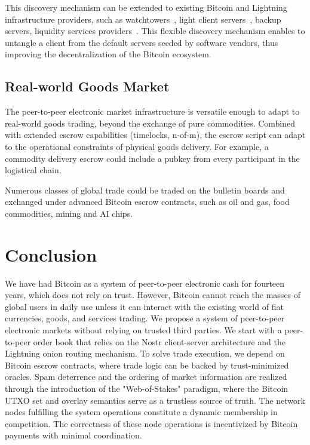 \documentclass[pdflatex,sn-mathphys]{sn-jnl}%
\theoremstyle{thmstyleone}%
\theoremstyle{thmstyletwo}%
\theoremstyle{thmstylethree}%
\begin{document}
This discovery mechanism can be extended to existing Bitcoin and Lightning infrastructure providers, such as watchtowers~\cite{Watchtower2016Dryja}, light client servers~\cite{Lightweight2013Hearn}, backup servers, liquidity services providers~\cite{LSP2019Sheinfeld}. This flexible discovery mechanism enables to untangle a client from the default servers seeded by software vendors, thus improving the decentralization of the Bitcoin ecosystem.

\subsection{Real-world Goods Market}

The peer-to-peer electronic market infrastructure is versatile enough to adapt to real-world goods trading, beyond the exchange of pure commodities. Combined with extended escrow capabilities (timelocks, n-of-m), the escrow script can adapt to the operational constraints of physical goods delivery. For example, a commodity delivery escrow could include a pubkey from every participant in the logistical chain.

Numerous classes of global trade could be traded on the bulletin boards and exchanged under advanced Bitcoin escrow contracts, such as oil and gas, food commodities, mining and AI chips.

\section{Conclusion}

We have had Bitcoin as a system of peer-to-peer electronic cash for fourteen years, which does not rely on trust. However, Bitcoin cannot reach the masses of global users in daily use unless it can interact with the existing world of fiat currencies, goods, and services trading. We propose a system of peer-to-peer electronic markets without relying on trusted third parties. We start with a peer-to-peer order book that relies on the Nostr client-server architecture and the Lightning onion routing mechanism. To solve trade execution, we depend on Bitcoin escrow contracts, where trade logic can be backed by trust-minimized oracles. Spam deterrence and the ordering of market information are realized through the introduction of the "Web-of-Stakes" paradigm, where the Bitcoin UTXO set and overlay semantics serve as a trustless source of truth. The network nodes fulfilling the system operations constitute a dynamic membership in competition. The correctness of these node operations is incentivized by Bitcoin payments with minimal coordination.
\end{document}
